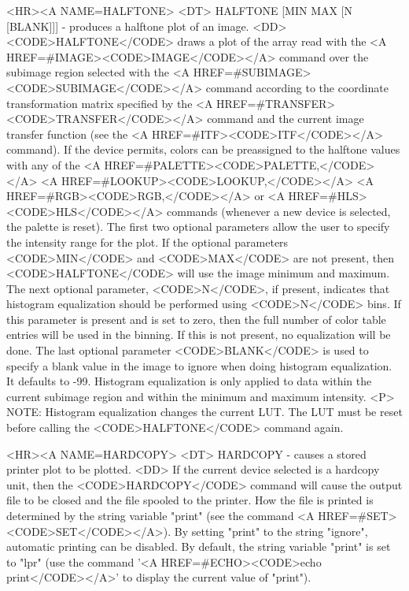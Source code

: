 \begin{rawhtml}
<HR><A NAME=HALFTONE>
<DT>
HALFTONE [MIN MAX [N [BLANK]]] - produces a halftone plot of an image.
<DD>
	<CODE>HALFTONE</CODE> draws a plot of the array read with the
	<A HREF=#IMAGE><CODE>IMAGE</CODE></A> command over the subimage
	region selected with the <A HREF=#SUBIMAGE><CODE>SUBIMAGE</CODE></A>
	command according to the coordinate transformation matrix
	specified by the <A HREF=#TRANSFER><CODE>TRANSFER</CODE></A>
	command and the current image transfer function (see the
	<A HREF=#ITF><CODE>ITF</CODE></A> command).
	If the device permits, colors
	can be preassigned to the halftone values with any of the
	<A HREF=#PALETTE><CODE>PALETTE,</CODE></A>
	<A HREF=#LOOKUP><CODE>LOOKUP,</CODE></A>
	<A HREF=#RGB><CODE>RGB,</CODE></A> or
	<A HREF=#HLS><CODE>HLS</CODE></A> commands
	(whenever a new device is selected, the palette is reset).
	The first two optional parameters allow the user to specify the
	intensity range for the plot.
	If the optional parameters <CODE>MIN</CODE> and
	<CODE>MAX</CODE> are not present,
	then <CODE>HALFTONE</CODE> will use the image minimum and maximum.
	The next optional parameter, <CODE>N</CODE>, if present,
	indicates that histogram equalization should be performed using
	<CODE>N</CODE> bins.  If this parameter is present and is set to
	zero, then the full number of color table entries will be used
	in the binning.  If this is not present, no equalization will be done.
	The last optional parameter <CODE>BLANK</CODE> is used to
	specify a blank value in the image to ignore when doing
	histogram equalization.  It defaults to -99.
	Histogram equalization is only applied to data within the
	current subimage region and within the minimum and maximum intensity.
	<P>
	NOTE: Histogram equalization changes the current LUT.  The LUT
	must be reset before calling the <CODE>HALFTONE</CODE> command again.

<HR><A NAME=HARDCOPY>
<DT>
HARDCOPY - causes a stored printer plot to be plotted.
<DD>
	If the current device selected is a hardcopy unit, then the
	<CODE>HARDCOPY</CODE> command will cause the output file to be
	closed and the file spooled to the printer.  How the file is
	printed is determined by the string variable "print" (see the
	command <A HREF=#SET><CODE>SET</CODE></A>).  By setting "print"
	to the string "ignore", automatic printing can be disabled.
	By default, the string variable "print" is set to "lpr"
	(use the command '<A HREF=#ECHO><CODE>echo print</CODE></A>'
	to display the current value of "print").


\end{rawhtml}
